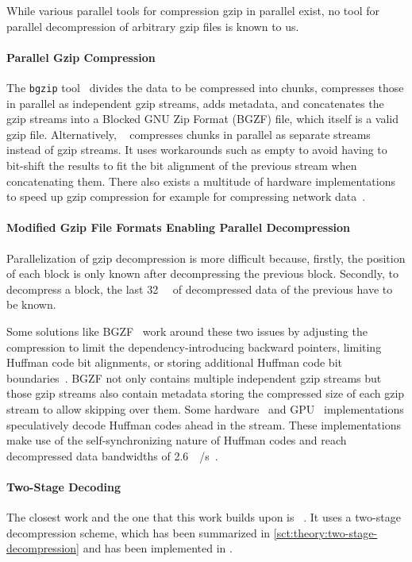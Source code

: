 
While various parallel tools for compression gzip in parallel exist, no tool for parallel decompression of arbitrary gzip files is known to us.

\paragraph{Parallel Gzip Compression}

The \texttt{bgzip} tool~\cite{htslib} divides the data to be compressed into chunks, compresses those in parallel as independent gzip streams, adds metadata, and concatenates the gzip streams into a Blocked GNU Zip Format (BGZF) file, which itself is a valid gzip file.
Alternatively, \pigz~\cite{pigz} compresses chunks in parallel as separate  streams instead of gzip streams.
It uses workarounds such as empty \rawblocks to avoid having to bit-shift the results to fit the bit alignment of the previous  stream when concatenating them.
There also exists a multitude of hardware implementations to speed up gzip compression for example for compressing network data~\cite{gzip_on_a_chip,qat,Ledwon2020HighThroughputFH}.

\paragraph{Modified Gzip File Formats Enabling Parallel Decompression}

Parallelization of gzip decompression is more difficult because, firstly, the position of each block is only known after decompressing the previous block.
Secondly, to decompress a  block, the last \SI{32}{\kibi\byte} of decompressed data of the previous  have to be known.

Some solutions like BGZF~\cite{htslib} work around these two issues by adjusting the compression to limit the dependency-introducing backward pointers, limiting Huffman code bit alignments, or storing additional Huffman code bit boundaries~\cite{gpu-decompresion}.
BGZF not only contains multiple independent gzip streams but those gzip streams also contain metadata storing the compressed size of each gzip stream to allow skipping over them.
Some hardware~\cite{cmos-gzip-decompression} and GPU~\cite{gpu-huffman} implementations speculatively decode Huffman codes ahead in the stream.
These implementations make use of the self-synchronizing nature of Huffman codes and reach decompressed data bandwidths of \SI{2.6}{\giga\byte/\second}~\cite{cmos-gzip-decompression}.



\paragraph{Two-Stage Decoding}

The closest work and the one that this work builds upon is \pugz~\cite{pugz}.
It uses a two-stage decompression scheme, which has been summarized in \cref{sct:theory:two-stage-decompression} and has been implemented in \pragzip.
